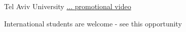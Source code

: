 \begin{frame}[label=intro-3]{Tel Aviv University \href{http://www.youtube.com/watch?v=rbUevEuYQHg}{ ...  promotional video}}
\begin{multicols}{2}
\centering
{} 
\end{multicols}
\end{frame}


\begin{frame}[label=intro-4]{International students are welcome - see this opportunity}
\begin{center}
\end{center}
\end{frame}

% 